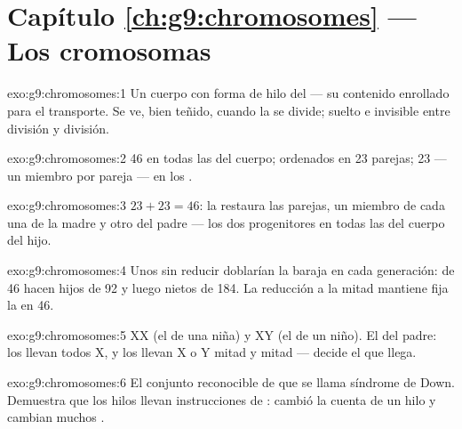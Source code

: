 \section*{Capítulo \ref{ch:g9:chromosomes} --- Los cromosomas}

\begin{solution}{exo:g9:chromosomes:1}
Un cuerpo con forma de hilo del  --- su contenido enrollado para
el transporte. Se ve, bien teñido, cuando la  se divide; suelto e
invisible entre división y división.
\end{solution}

\begin{solution}{exo:g9:chromosomes:2}
46 en todas las  del cuerpo; ordenados en 23 parejas; 23 --- un
miembro por pareja --- en los .
\end{solution}

\begin{solution}{exo:g9:chromosomes:3}
$23 + 23 = 46$: la  restaura las parejas, un miembro de cada
una de la madre y otro del padre --- los dos progenitores en todas las
 del cuerpo del hijo.
\end{solution}

\begin{solution}{exo:g9:chromosomes:4}
Unos  sin reducir doblarían la baraja en cada generación:
 de 46 hacen hijos de 92 y luego nietos de 184. La reducción a
la mitad mantiene fija la  en 46.
\end{solution}

\begin{solution}{exo:g9:chromosomes:5}
XX (el  de una niña) y XY (el de un niño). El del padre: los
 llevan todos X, y los  llevan X o Y mitad y mitad
--- decide el  que llega.
\end{solution}

\begin{solution}{exo:g9:chromosomes:6}
El conjunto reconocible de  que se llama síndrome de Down.
Demuestra que los hilos llevan instrucciones de : cambió la
cuenta de un hilo y cambian muchos .
\end{solution}

